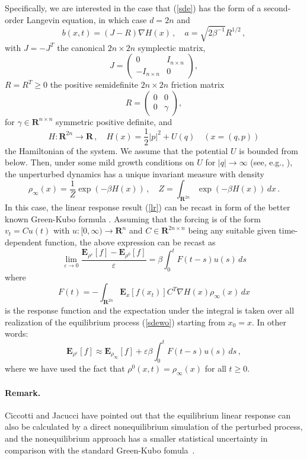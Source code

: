 \documentclass[]{tMPH2e}
\newcommand{\recheck}[1]{{\color{red} #1}}
\newcommand{\R}{{\mathbf R}}
\newcommand{\eps}{\varepsilon}
\newcommand{\bE}{{\mathbf E}}
\begin{document}
Specifically, we are interested in the case that (\ref{sde}) has the form of a second-order Langevin equation, in which case $d=2n$ and 
\begin{equation}\label{eqn:langevin-1}
b(x,t) = (J-R)\nabla H(x)\,,\quad a = \sqrt{2\beta^{-1}}R^{1/2}\,,
\end{equation}
with $J=-J^{T}$ the canonical $2n\times 2n$ symplectic matrix,
\[
J = \left ( \begin{array}{cc} 
0 & I_{n\times n} \\ -I_{n\times n} &0
\end{array}\right),
\]
$R=R^{T}\ge 0$ the positive semidefinite $2n\times 2n$ friction matrix 
\[
R = \left ( \begin{array}{cc}
0 & 0 \\ 0 & \gamma
\end{array}\right),
\]
for $\gamma\in\R^{n\times n}$ symmetric positive definite, and 
\[
H\colon\R^{2n}\to\R\,,\quad H(x) = \frac{1}{2}|p|^{2} + U(q) \quad (x=(q,p))
\] 
the Hamiltonian of the system. We assume that the potential $U$ is bounded from below. Then, under some mild growth conditions on $U$ for $|q|\to\infty$ (see, e.g., \cite{mattingly2002}), the unperturbed dynamics has a unique invariant measure with density 
\[
\rho_{\infty}(x) = \frac{1}{Z}\exp(-\beta H(x))\,,\quad  Z=\int_{\R^{2n}}  \exp(-\beta H(x))\,dx\,.
\] 
In this case, the linear response result (\ref{lr}) can be recast in form of the better known Green-Kubo formula \cite{risken1996}. Assuming that the forcing is of the form $v_{t}=Cu(t)$ with $u\colon[0,\infty)\to\R^{n}$ and $C\in\R^{2n\times n}$ being any suitable given time-dependent function, the above expression can be recast as 
\begin{equation}\label{GreenKubo}
\lim_{\eps\to 0}\frac{\bE_{\rho^{\eps}}[f] - \bE_{\rho^{0}}[f]}{\eps} = \beta\int_{0}^{t}F(t-s)u(s)\,ds
\end{equation}
where 
\[
F(t) = - \int_{\R^{2n}}\bE_{x}[f(x_{t})] C^{T}\nabla H(x)\rho_{\infty}(x)\,dx
\]
is the response function and the expectation under the integral is taken over all realization of the equilibrium process (\ref{sdewo}) starting from $x_{0}=x$. In other words: 
\[
\bE_{\rho^{\eps}}[f] \approx \bE_{\rho_{\infty}}[f] + \eps\beta\int_{0}^{t}F(t-s)u(s)\,ds\,,
\]
where we have used the fact that $\rho^{0}(x,t)= \rho_{\infty}(x)$ for
all $t\ge 0$.

\paragraph*{Remark.}
\recheck{Ciccotti and Jacucci have pointed out that
  the equilibrium linear response
can also be calculated by a direct nonequilibrium simulation of the
perturbed process, and  the nonequilibrium
approach has a smaller statistical uncertainty in comparison with the
standard Green-Kubo fomula~\cite{ciccotti1975direct}.
}
\end{document}
